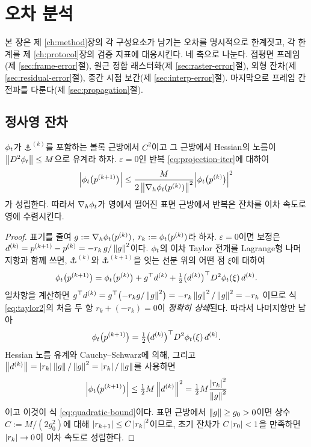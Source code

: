 \chapter{오차 분석}
\label{ch:error}

본 장은 제 \ref{ch:method}장의 각 구성요소가 남기는 오차를 명시적으로 한계짓고, 각
한계를 제 \ref{ch:protocol}장의 검증 지표에 대응시킨다. 네 축으로 나눈다. 접평면
프레임(제 \ref{sec:frame-error}절), 원근 정합 래스터화(제 \ref{sec:raster-error}절),
외형 잔차(제 \ref{sec:residual-error}절), 중간 시점 보간(제 \ref{sec:interp-error}절).
마지막으로 프레임 간 전파를 다룬다(제 \ref{sec:propagation}절).

\section{정사영 잔차}
\label{sec:projection-error}

\begin{lemma}[이차 잔차 한계]
\label{lem:quadratic}
$\phi_t$가 $\anchor^{(k)}$를 포함하는 볼록 근방에서 $C^2$이고 그 근방에서 Hessian의
노름이 $\left\lVert D^2\phi_t \right\rVert\le M$으로 유계라 하자. $\varepsilon=0$인 반복
\eqref{eq:projection-iter}에 대하여
\begin{equation}
  \Bigl\lvert \phi_t\bigl(p^{(k+1)}\bigr)\Bigr\rvert
  \le \frac{M}{2\left\lVert \nabla_h\phi_t(p^{(k)}) \right\rVert^2}
      \Bigl\lvert \phi_t\bigl(p^{(k)}\bigr)\Bigr\rvert^2
  \label{eq:quadratic-bound}
\end{equation}
가 성립한다. 따라서 $\nabla_h\phi_t$가 영에서 떨어진 표면 근방에서 반복은 잔차를 이차
속도로 영에 수렴시킨다.
\end{lemma}

\begin{proof}
표기를 줄여 $g := \nabla_h\phi_t(p^{(k)})$, $r_k := \phi_t(p^{(k)})$라 하자.
$\varepsilon=0$이면 보정은
$d^{(k)} = p^{(k+1)}-p^{(k)} = -r_k\,g/\left\lVert g \right\rVert^2$이다. $\phi_t$의 이차
Taylor 전개를 Lagrange형 나머지항과 함께 쓰면, $\anchor^{(k)}$와 $\anchor^{(k+1)}$을
잇는 선분 위의 어떤 점 $\xi$에 대하여
\begin{equation}
  \phi_t\bigl(p^{(k+1)}\bigr)
  = \phi_t\bigl(p^{(k)}\bigr) + g^{\top} d^{(k)}
  + \tfrac{1}{2}\bigl(d^{(k)}\bigr)^{\top} D^2\phi_t(\xi)\,d^{(k)}.
  \label{eq:taylor2}
\end{equation}
일차항을 계산하면
$g^{\top} d^{(k)} = g^{\top}\bigl(-r_k g/\left\lVert g \right\rVert^2\bigr) = -r_k\left\lVert g \right\rVert^2/\left\lVert g \right\rVert^2 = -r_k$
이므로 식 \eqref{eq:taylor2}의 처음 두 항 $r_k + (-r_k) = 0$이 \emph{정확히 상쇄}된다.
따라서 나머지항만 남아
\[
  \phi_t\bigl(p^{(k+1)}\bigr)
  = \tfrac{1}{2}\bigl(d^{(k)}\bigr)^{\top} D^2\phi_t(\xi)\,d^{(k)}.
\]
Hessian 노름 유계와 Cauchy--Schwarz에 의해, 그리고
$\left\lVert d^{(k)} \right\rVert = \left\lvert r_k \right\rvert\left\lVert g \right\rVert/\left\lVert g \right\rVert^2 = \left\lvert r_k \right\rvert/\left\lVert g \right\rVert$를 사용하면
\[
  \Bigl\lvert\phi_t\bigl(p^{(k+1)}\bigr)\Bigr\rvert
  \le \tfrac{1}{2}M\left\lVert d^{(k)} \right\rVert^2
  = \tfrac{1}{2}M\frac{\left\lvert r_k \right\rvert^2}{\left\lVert g \right\rVert^2}
\]
이고 이것이 식 \eqref{eq:quadratic-bound}이다. 표면 근방에서 $\left\lVert g \right\rVert\ge g_0>0$이면
상수 $C := M/(2g_0^2)$에 대해 $\left\lvert r_{k+1} \right\rvert\le C\left\lvert r_k \right\rvert^2$이므로, 초기 잔차가
$C\left\lvert r_0 \right\rvert<1$을 만족하면 $\left\lvert r_k \right\rvert\to0$이 이차 속도로 성립한다.
\end{proof}

